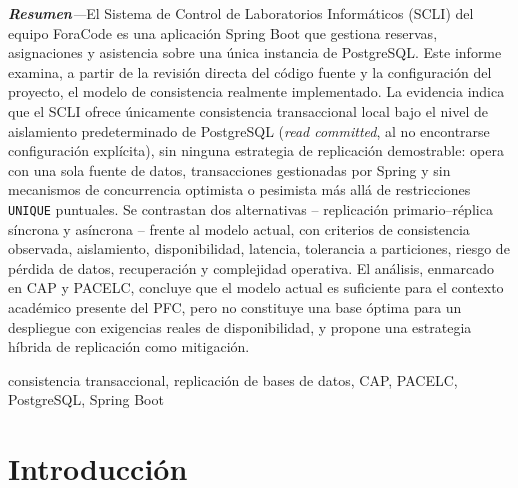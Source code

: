 \documentclass[conference]{IEEEtran}
\begin{document}
\author{
}

\maketitle

\noindent\textit{\textbf{Resumen}---}El Sistema de Control de Laboratorios Inform\'aticos (SCLI) del equipo ForaCode es una aplicaci\'on Spring Boot que gestiona reservas, asignaciones y asistencia sobre una \'unica instancia de PostgreSQL. Este informe examina, a partir de la revisi\'on directa del c\'odigo fuente y la configuraci\'on del proyecto, el modelo de consistencia realmente implementado. La evidencia indica que el SCLI ofrece \'unicamente consistencia transaccional local bajo el nivel de aislamiento predeterminado de PostgreSQL (\emph{read committed}, al no encontrarse configuraci\'on expl\'icita), sin ninguna estrategia de replicaci\'on demostrable: opera con una sola fuente de datos, transacciones gestionadas por Spring y sin mecanismos de concurrencia optimista o pesimista m\'as all\'a de restricciones \texttt{UNIQUE} puntuales. Se contrastan dos alternativas -- replicaci\'on primario--r\'eplica s\'incrona y as\'incrona -- frente al modelo actual, con criterios de consistencia observada, aislamiento, disponibilidad, latencia, tolerancia a particiones, riesgo de p\'erdida de datos, recuperaci\'on y complejidad operativa. El an\'alisis, enmarcado en CAP y PACELC, concluye que el modelo actual es suficiente para el contexto acad\'emico presente del PFC, pero no constituye una base \'optima para un despliegue con exigencias reales de disponibilidad, y propone una estrategia h\'ibrida de replicaci\'on como mitigaci\'on.

\begin{IEEEkeywords}
consistencia transaccional, replicaci\'on de bases de datos, CAP, PACELC, PostgreSQL, Spring Boot
\end{IEEEkeywords}

\section{Introducci\'on}
\end{document}

